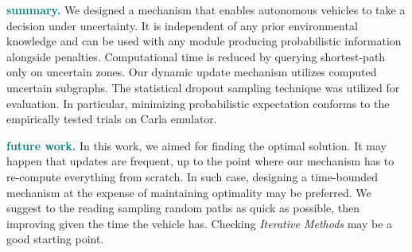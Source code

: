 \textcolor{teal}{\textbf{summary.}} We designed a mechanism that enables autonomous vehicles to take a decision under uncertainty. It is independent of any prior environmental knowledge and can be used with any module producing probabilistic information alongside penalties. Computational time is reduced by querying shortest-path only on uncertain zones. Our dynamic update mechanism utilizes computed uncertain subgraphs. The statistical dropout sampling technique was utilized for evaluation. In particular, minimizing probabilistic expectation conforms to the empirically tested trials on Carla emulator.

\textcolor{teal}{\textbf{future work.}} In this work, we aimed for finding the optimal solution. It may happen that updates are frequent, up to the point where our mechanism has to re-compute everything from scratch. In such case, designing a time-bounded mechanism at the expense of maintaining optimality may be preferred. We suggest to the reading sampling random paths as quick as possible, then improving given the time the vehicle has. Checking \textit{Iterative Methods} may be a good starting point.